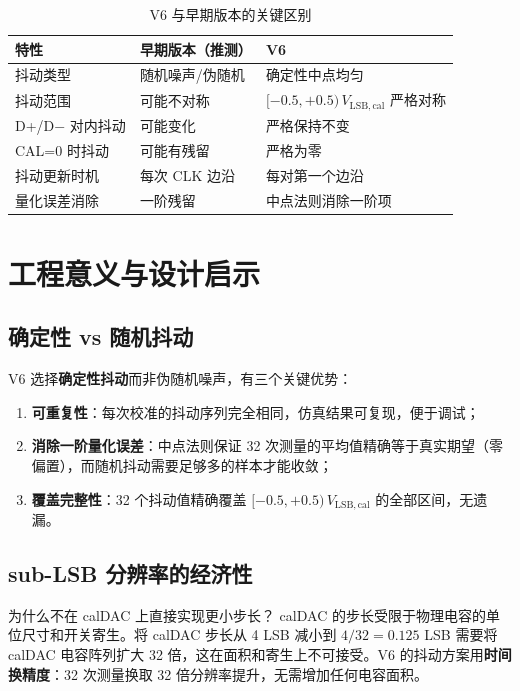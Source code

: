 \documentclass[UTF8,a4paper,11pt]{ctexart}
\newcommand{\Vlsb}{V_{\mathrm{LSB,cal}}}
\begin{document}
\begin{table}[H]
\centering
\caption{V6 与早期版本的关键区别}
\label{tab:versions}
\small
\begin{tabularx}{\textwidth}{l X X}
\toprule
特性 & 早期版本（推测） & V6 \\
\midrule
抖动类型 & 随机噪声/伪随机 & 确定性中点均匀 \\
抖动范围 & 可能不对称 & $[-0.5, +0.5)\,\Vlsb$ 严格对称 \\
D+/D$-$ 对内抖动 & 可能变化 & 严格保持不变 \\
CAL=0 时抖动 & 可能有残留 & 严格为零 \\
抖动更新时机 & 每次 CLK 边沿 & 每对第一个边沿 \\
量化误差消除 & 一阶残留 & 中点法则消除一阶项 \\
\bottomrule
\end{tabularx}
\end{table}

\section{工程意义与设计启示}

\subsection{确定性 vs 随机抖动}

V6 选择\textbf{确定性抖动}而非伪随机噪声，有三个关键优势：

\begin{enumerate}[leftmargin=2em]
    \item \textbf{可重复性}：每次校准的抖动序列完全相同，仿真结果可复现，便于调试；
    \item \textbf{消除一阶量化误差}：中点法则保证 32 次测量的平均值精确等于真实期望（零偏置），而随机抖动需要足够多的样本才能收敛；
    \item \textbf{覆盖完整性}：32 个抖动值精确覆盖 $[-0.5, +0.5)\,\Vlsb$ 的全部区间，无遗漏。
\end{enumerate}

\subsection{sub-LSB 分辨率的经济性}

\begin{tipbox}{为什么不在 calDAC 上直接实现更小步长？}
calDAC 的步长受限于物理电容的单位尺寸和开关寄生。将 calDAC 步长从 4 LSB 减小到 $4/32 = 0.125$ LSB 需要将 calDAC 电容阵列扩大 32 倍，这在面积和寄生上不可接受。V6 的抖动方案用\textbf{时间换精度}：32 次测量换取 32 倍分辨率提升，无需增加任何电容面积。
\end{tipbox}
\end{document}
